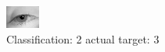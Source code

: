 \begin{figure}[h!]
\begin{center}
\includegraphics[width=0.60\columnwidth]{figures/ID2870_class_2_target_3.png}
\end{center}
\caption{ Classification: 2 actual target: 3}
\label{fig:ID2870_class_2_target_3}
\end{figure}
